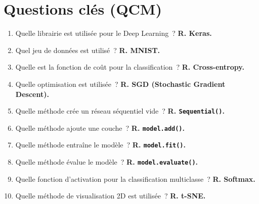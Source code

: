 \documentclass[a4paper,11pt]{article}
\begin{document}
\newpage
\section*{Questions cl\'es (QCM)}

\begin{enumerate}
  \item Quelle librairie est utilis\'ee pour le Deep Learning~?
    \textbf{R. Keras.}
  \item Quel jeu de donn\'ees est utilis\'e~? \textbf{R. MNIST.}
  \item Quelle est la fonction de co\^ut pour la classification~?
    \textbf{R. Cross-entropy.}
  \item Quelle optimisation est utilis\'ee~?
    \textbf{R. SGD (Stochastic Gradient Descent).}
  \item Quelle m\'ethode cr\'ee un r\'eseau s\'equentiel vide~?
    \textbf{R. \texttt{Sequential()}.}
  \item Quelle m\'ethode ajoute une couche~?
    \textbf{R. \texttt{model.add()}.}
  \item Quelle m\'ethode entra\^ine le mod\`ele~?
    \textbf{R. \texttt{model.fit()}.}
  \item Quelle m\'ethode \'evalue le mod\`ele~?
    \textbf{R. \texttt{model.evaluate()}.}
  \item Quelle fonction d'activation pour la classification
    multiclasse~? \textbf{R. Softmax.}
  \item Quelle m\'ethode de visualisation 2D est utilis\'ee~?
    \textbf{R. t-SNE.}
\end{enumerate}
\end{document}

